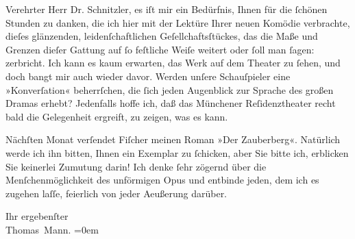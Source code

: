 \pstart{}Verehrter Herr Dr. Schnitzler,\pend\vspace{0.5em}
\pstart
           es iſt mir ein Bedürfnis, Ihnen für die{ }ſchönen Stunden zu danken, die ich hier mit
               der Lektüre Ihrer neuen Komödie verbrachte, dieſes glänzenden, leidenſchaftlichen
               Geſellchaftsſtückes, das die Maße und Grenzen dieſer Gattung auf{ }ſo feſtliche Weiſe
               weitert oder{ }ſoll man{ }ſagen: zerbricht. Ich kann es kaum erwarten, das Werk auf dem
               Theater zu{ }ſehen, und doch bangt mir auch wieder davor. Werden unſere Schauſpieler
               eine »Konverſation« beherrſchen, die{ }ſich jeden Augenblick zur Sprache des großen
               Dramas erhebt? Jedenfalls hoffe ich, daß das Münchener
                  Reſidenztheater recht bald die Gelegenheit ergreift, zu {\pb}zeigen, was es kann.\pend
           
\pstart
           Nächſten Monat verſendet Fiſcher meinen Roman
                  »Der Zauberberg«. Natürlich werde ich ihn
               bitten, Ihnen ein Exemplar zu{ }ſchicken, aber Sie bitte ich, erblicken Sie keinerlei
               Zumutung darin! Ich denke{ }ſehr zögernd über die Menſchenmöglichkeit des unförmigen
                  Opus und entbinde jeden,
               dem ich es zugehen laſſe, feierlich von jeder Aeußerung darüber.\pend
           
\pstart
           Ihr ergebenſter{\\[\baselineskip]}\spacefill\mbox{Thomas Mann.}\pend
           \leftskip=0em{}\endnumbering{}  \newcommand{\dateiname}{L02417}\newcommand{\titel}{Thomas Mann an Arthur Schnitzler, 22. 10. 1924}\newcommand{\editorInnen}{Martin Anton Müller und Gerd-Hermann Susen}

